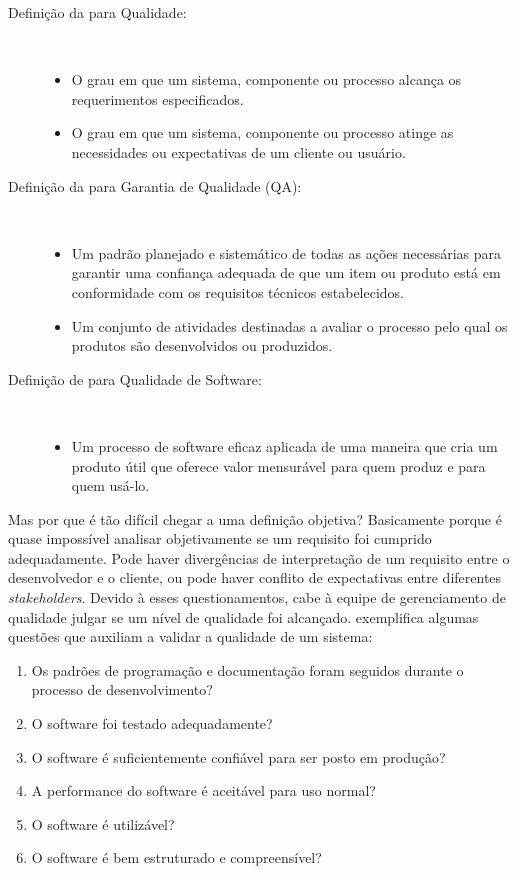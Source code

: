 \documentclass[
	12pt,				%
	openright,			%
	twoside,			%
	a4paper,			%
	english,			%
	brazil,				%
	]{abntex2}
\begin{document}
\begin{description}
    \item[Definição da  para Qualidade:] \hfill \\
        \begin{itemize}
            \item O grau em que um sistema, componente ou processo alcança os requerimentos especificados.
            \item O grau em que um sistema, componente ou processo atinge as necessidades ou expectativas de um cliente ou usuário.
        \end{itemize}
    \item[Definição da  para Garantia de Qualidade (QA):] \hfill \\
        \begin{itemize}
            \item Um padrão planejado e sistemático de todas as ações necessárias para garantir uma confiança adequada de que um item ou produto está em conformidade com os requisitos técnicos estabelecidos.
            \item Um conjunto de atividades destinadas a avaliar o processo pelo qual os produtos são desenvolvidos ou produzidos.
        \end{itemize}
    \item[Definição de  para Qualidade de Software:] \hfill \\
        \begin{itemize}
            \item Um processo de software eficaz aplicada de uma maneira que cria um produto útil que oferece valor mensurável para quem produz e para quem usá-lo.
        \end{itemize}
\end{description}

Mas por que é tão difícil chegar a uma definição objetiva? Basicamente porque é quase impossível analisar objetivamente se um requisito foi cumprido adequadamente. Pode haver divergências de interpretação de um requisito entre o desenvolvedor e o cliente, ou pode haver conflito de expectativas entre diferentes \emph{stakeholders}. Devido à esses questionamentos, cabe à equipe de gerenciamento de qualidade julgar se um nível de qualidade foi alcançado.  exemplifica algumas questões que auxiliam a validar a qualidade de um sistema:
\begin{enumerate}
  \item Os padrões de programação e documentação foram seguidos durante o processo de desenvolvimento?
  \item O software foi testado adequadamente?
  \item O software é suficientemente confiável para ser posto em produção?
  \item A performance do software é aceitável para uso normal?
  \item O software é utilizável?
  \item O software é bem estruturado e compreensível?
\end{enumerate}
\end{document}
